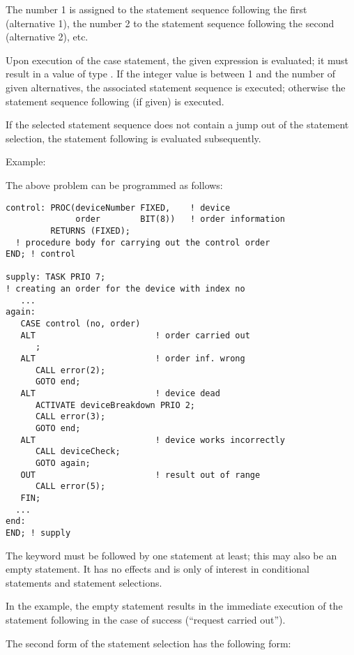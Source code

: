 The number 1 is assigned to the statement sequence following the first
 (alternative 1), the number 2 to the statement sequence following
the second  (alternative 2), etc.

Upon execution of the case statement, the given expression is
evaluated; it must result in a value of type . If the integer value
is between 1 and the number of given alternatives, the associated
statement sequence is executed; otherwise the statement sequence
following  (if given) is executed.

If the selected statement sequence does not contain a jump out of the
statement selection, the statement following  is evaluated
subsequently.

Example:

The above problem can be programmed as follows:

\begin{lstlisting}
control: PROC(deviceNumber FIXED,    ! device 
              order        BIT(8))   ! order information
         RETURNS (FIXED);  
  ! procedure body for carrying out the control order
END; ! control 
 
supply: TASK PRIO 7;
! creating an order for the device with index no 
   ... 
again:  
   CASE control (no, order)
   ALT                        ! order carried out 
      ; 
   ALT                        ! order inf. wrong 
      CALL error(2);
      GOTO end;
   ALT                        ! device dead
      ACTIVATE deviceBreakdown PRIO 2;
      CALL error(3);
      GOTO end;
   ALT                        ! device works incorrectly
      CALL deviceCheck;
      GOTO again;
   OUT                        ! result out of range
      CALL error(5);
   FIN; 
  ...         
end: 
END; ! supply 
\end{lstlisting}

The keyword  must be followed by
one statement at least; this may also be an empty statement. It has no
effects and is only of interest in conditional statements and statement
selections.

In the example, the empty statement results in the immediate execution
of the statement following  in the case of success (``request carried
out'').


The second form of the statement selection has the following form:

\begin{grammarframe}
\end{grammarframe}

